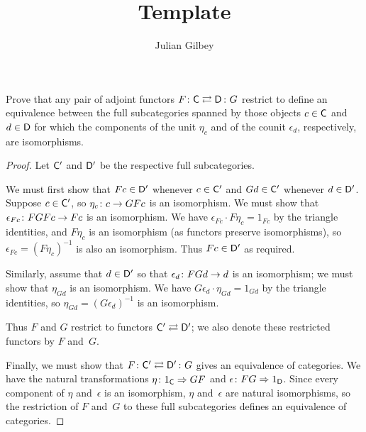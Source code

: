 \documentclass[../../solutions]{subfiles}
\title{Template}
\author{Julian Gilbey}
\begin{document}
\maketitle

%   

\begin{exercise}
  Prove that any pair of adjoint functors $\afunc{F}{G}{\sC}{\sD}$
  restrict to define an equivalence between the full subcategories
  spanned by those objects $c\in\mathsf{C}$ and $d\in\mathsf{D}$ for which the
  components of the unit $\eta_c$ and of the counit $\epsilon_d$,
  respectively, are isomorphisms.
\end{exercise}

\begin{proof}
  Let $\mathsf{C}'$ and $\mathsf{D}'$ be the respective full subcategories.

  We must first show that $Fc\in\mathsf{D}'$ whenever $c\in\mathsf{C}'$ and
  $Gd\in\mathsf{C}'$ whenever $d\in\mathsf{D}'$.  Suppose $c\in\mathsf{C}'$, so
  ${\eta_c}\colon{c}\to{GFc}$ is an isomorphism.  We must show that
  ${\epsilon_{Fc}}\colon{FGFc}\to{Fc}$ is an isomorphism.  We have
  $\epsilon_{Fc}\cdot F\eta_c=1_{Fc}$ by the triangle identities, and
  $F\eta_c$ is an isomorphism (as functors preserve isomorphisms), so
  $\epsilon_{Fc}=(F\eta_c)^{-1}$ is also an isomorphism.  Thus
  $Fc\in\mathsf{D}'$ as required.

  Similarly, assume that $d\in\mathsf{D}'$ so that
  ${\epsilon_d}\colon{FGd}\to{d}$ is an isomorphism; we must show that
  $\eta_{Gd}$ is an isomorphism.  We have
  $G\epsilon_d\cdot\eta_{Gd}=1_{Gd}$ by the triangle identities, so
  $\eta_{Gd}=(G\epsilon_d)^{-1}$ is an isomorphism.

  Thus $F$ and $G$ restrict to functors $\mathsf{C}'\rightleftarrows\mathsf{D}'$; we
  also denote these restricted functors by $F$ and~$G$.

  Finally, we must show that $\afunc{F}{G}{\sC'}{\sD'}$ gives an
  equivalence of categories.  We have the natural transformations
  ${\eta}\colon{1_{\mathsf{C}}}\Rightarrow{GF}$ and ${\epsilon}\colon{FG}\Rightarrow{1_{\mathsf{D}}}$.  Since
  every component of $\eta$ and~$\epsilon$ is an isomorphism, $\eta$
  and~$\epsilon$ are natural isomorphisms, so the restriction of $F$
  and~$G$ to these full subcategories defines an equivalence of
  categories.
\end{proof}
\end{document}
